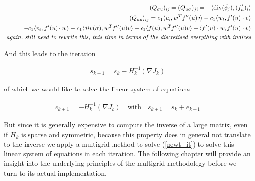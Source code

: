 \documentclass[../draft_1.tex]{subfiles}
\begin{document}
\begin{ceqn}
	\begin{align}
(Q_{\sigma u})_{ij}  = (Q_{u\sigma})_{ji} = - \langle \mathop{}\!\mathrm{div}(\tilde{\phi_j}), (f'_h)_i \rangle \\
(Q_{u u})_{ij} = c_1 \langle u_t, w^T f''(u) v \rangle - c_1 \langle w_t, f'(u) \cdot v \rangle  \\
- c_1 \langle v_t, f'(u) \cdot w \rangle  - c_1 \langle div(\sigma), w^T f''(u) v \rangle + c_1 \langle f(u), w^T f''(u) v \rangle + \langle f'(u) \cdot w, f'(u) \cdot v \rangle \\
\textit{  again, still need to rewrite this, this time in terms of the discretised everything with indices}
	\end{align}
\end{ceqn}
And this leads to the iteration
\begin{ceqn}
	\begin{align}	
	s_{k+1} = s_k - H_k^{-1}(\nabla J_k)
	\end{align}
\end{ceqn}
of which we would like to solve the linear system of equations 
\begin{ceqn}
	\begin{align}	
	\label{newt_it}
	e_{k+1} = - H_k^{-1}(\nabla J_k) \quad \text{with} \quad
	s_{k+1} =  s_k + e_{k+1}
	\end{align}
\end{ceqn}
But since it is generally expensive to compute the inverse of a large matrix, even if $H_k$ is sparse and symmetric, because this property does in general not translate to the inverse we apply a multigrid method to solve (\ref{newt_it}) to solve this linear system of equations in each iteration. The following chapter will provide an insight into the underlying principles of the multigrid methodology before we turn to its actual implementation.
\end{document}
